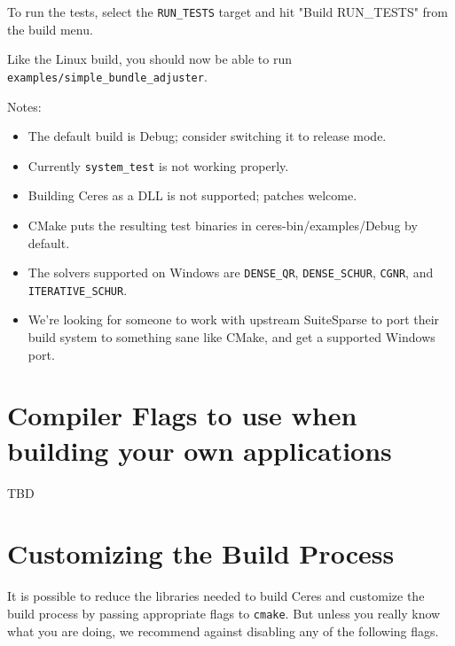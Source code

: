 To run the tests, select the \texttt{RUN\_TESTS} target and hit "Build RUN\_TESTS" from the build menu.

Like the Linux build, you should now be able to run \texttt{examples/simple\_bundle\_adjuster}.

Notes:
\begin{itemize}
\item The default build is Debug; consider switching it to release mode.
\item Currently \texttt{system\_test} is not working properly.
\item Building Ceres as a DLL is not supported; patches welcome.
\item CMake puts the resulting test binaries in ceres-bin/examples/Debug by
      default.
\item The solvers supported on Windows are \texttt{DENSE\_QR},
      \texttt{DENSE\_SCHUR}, \texttt{CGNR}, and \texttt{ITERATIVE\_SCHUR}.
\item We're looking for someone to work with upstream SuiteSparse to port their
      build system to something sane like CMake, and get a supported Windows
      port.
\end{itemize}

\section{Compiler Flags to use when building your own applications}
\label{sec:compiler-flags}
TBD


\section{Customizing the Build Process}
\label{sec:custom}
It is possible to reduce the libraries needed to build Ceres and
customize the build process by passing appropriate flags to \texttt{cmake}. But unless you really know what you are
doing, we recommend against disabling any of the following flags.

